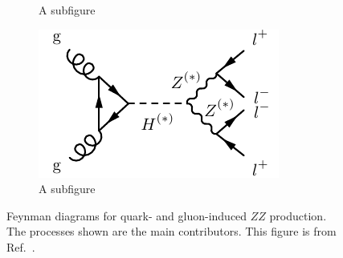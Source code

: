 \begin{figure}
\begin{subfigure}{.24\textwidth}
  \caption{A subfigure}
  \label{fig:m4lfeynman:ggZZ}
\end{subfigure}
\begin{subfigure}{.24\textwidth}
  \centering
  \includegraphics[width=.99\textwidth]{Figures/FeynGraphs/ggZZ4lhiggs.pdf}
  \caption{A subfigure}
  \label{fig:m4lfeynman:ggHZZ}
\end{subfigure}
\caption{Feynman diagrams for quark- and gluon-induced $ZZ$ production. The processes shown are the main contributors. This figure is from Ref.~\cite{m4l2021_paper}.}
\label{fig:m4lfeynman}
\end{figure}

